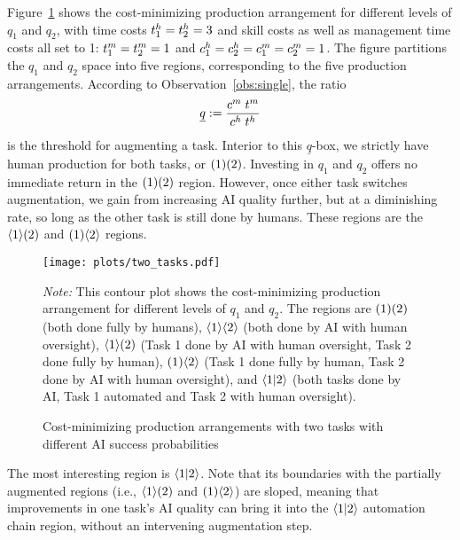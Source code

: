 \documentclass{article}
\theoremstyle{plain}
\theoremstyle{plain}
\begin{document}
Figure~\ref{fig:two_tasks} shows the cost-minimizing production arrangement for different levels of \(q_1\) and \(q_2\), with time costs \(t^{h}_{1} = t^{h}_{2} = 3\) and skill costs as well as management time costs all set to 1: \(t^{m}_{1} = t^{m}_{2} = 1\) and \(c^{h}_{1} = c^{h}_{2} = c^{m}_{1} = c^{m}_{2} = 1\).
The figure partitions the \(q_1\) and \(q_2\) space into five regions, corresponding to the five production arrangements.
According to Observation~\ref{obs:single}, the ratio 
\[
\underline{q} := \frac{c^{m}_{} \; t^{m}_{}}{c^{h}_{} \; t^{h}_{}}
\]
is the threshold for augmenting a task.
Interior to this \(\underline{q}\)-box, we strictly have human production for both tasks, or \(( 1 )( 2 )\).
Investing in \(q_1\) and \(q_2\) offers no immediate return in the \(( 1 )( 2 )\) region.
However, once either task switches augmentation, we gain from increasing AI quality further, but at a diminishing rate, so long as the other task is still done by humans.
These regions are the \(\langle 1 \rangle( 2 )\) and \(( 1 )\langle 2 \rangle\) regions.

\begin{figure}[h!]
  \caption{Cost-minimizing production arrangements with two tasks with different AI success probabilities} \label{fig:two_tasks}
  \begin{center}
  \texttt{[image: plots/two\_tasks.pdf]} \\
  \end{center}
\begin{footnotesize}
  \emph{Note:} This contour plot shows the cost-minimizing production arrangement for different levels of \(q_1\) and \(q_2\).
  The regions are \(( 1 )( 2 )\) (both done fully by humans), \(\langle 1 \rangle\langle 2 \rangle\) (both done by AI with human oversight), \(\langle 1 \rangle( 2 )\) (Task 1 done by AI with human oversight, Task 2 done fully by human), \(( 1 )\langle 2 \rangle\) (Task 1 done fully by human, Task 2 done by AI with human oversight), and \(\langle 1|2 \rangle\) (both tasks done by AI, Task 1 automated and Task 2 with human oversight).
\end{footnotesize}
\end{figure}

The most interesting region is \(\langle 1|2 \rangle\).
Note that its boundaries with the partially augmented regions (i.e., \(\langle 1 \rangle( 2 )\) and \(( 1 )\langle 2 \rangle\)) are sloped, meaning that improvements in one task's AI quality can bring it into the \(\langle 1|2 \rangle\) automation chain region, without an intervening augmentation step.
\end{document}

